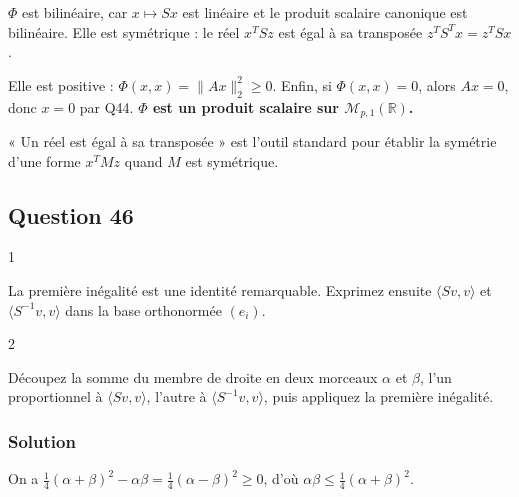 \documentclass[11pt,a4paper]{article}
\begin{document}
\(\Phi\) est bilinéaire, car \(x\mapsto Sx\) est linéaire et le produit scalaire canonique est bilinéaire. Elle est symétrique : le réel \(x^TSz\) est égal à sa transposée \(z^TS^Tx=z^TSx\).

Elle est positive : \(\Phi(x,x)=\|Ax\|_2^2\geqslant0\). Enfin, si \(\Phi(x,x)=0\), alors \(Ax=0\), donc \(x=0\) par Q44. \textbf{\(\Phi\) est un produit scalaire sur \(\mathcal M_{p,1}(\mathbb R)\).}

\begin{methode}

« Un réel est égal à sa transposée » est l'outil standard pour établir la symétrie d'une forme \(x^TMz\) quand \(M\) est symétrique.

\end{methode}

\hypertarget{question-46}{%
\subsection{Question 46}\label{question-46}}

\begin{indication}{1}

La première inégalité est une identité remarquable. Exprimez ensuite \(\langle Sv,v\rangle\) et \(\langle S^{-1}v,v\rangle\) dans la base orthonormée \((e_i)\).

\end{indication}

\begin{indication}{2}

Découpez la somme du membre de droite en deux morceaux \(\alpha\) et \(\beta\), l'un proportionnel à \(\langle Sv,v\rangle\), l'autre à \(\langle S^{-1}v,v\rangle\), puis appliquez la première inégalité.

\end{indication}

\hypertarget{solution-45}{%
\subsubsection{Solution}\label{solution-45}}

On a \(\frac14(\alpha+\beta)^2-\alpha\beta=\frac14(\alpha-\beta)^2\geqslant0\), d'où \(\boxed{\alpha\beta\leqslant\frac14(\alpha+\beta)^2.}\)
\end{document}
